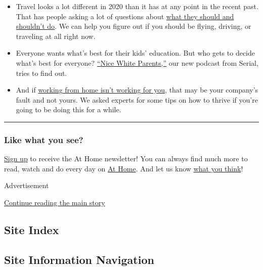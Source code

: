 \begin{itemize}
\item
  Travel looks a lot different in 2020 than it has at any point in the
  recent past. That has people asking a lot of questions about
  \href{https://www.nytimes.com/interactive/2020/07/31/travel/coronavirus-travel-risk.html}{what
  they should and shouldn't do}. We can help you figure out if you
  should be flying, driving, or traveling at all right now.
\item
  Everyone wants what's best for their kids' education. But who gets to
  decide what's best for everyone?
  \href{https://www.nytimes.com/2020/07/30/podcasts/nice-white-parents-serial.html?action=click\&module=Editors\%20Picks\&pgtype=Homepage}{``Nice
  White Parents,''} our new podcast from Serial, tries to find out.
\item
  And if
  \href{https://www.nytimes.com/2020/07/31/upshot/remote-work-tips.html}{working
  from home isn't working for you}, that may be your company's fault and
  not yours. We asked experts for some tips on how to thrive if you're
  going to be doing this for a while.
\end{itemize}

\begin{center}\rule{0.5\linewidth}{\linethickness}\end{center}

\hypertarget{like-what-you-see}{%
\subsubsection{Like what you see?}\label{like-what-you-see}}

\href{https://www.nytimes.com/newsletters/at-home}{Sign up} to receive
the At Home newsletter! You can always find much more to read, watch and
do every day on \href{https://www.nytimes.com/spotlight/at-home}{At
Home}. And let us know
\href{https://nyt.qualtrics.com/jfe/form/SV_e9cKGVFtci4CObz}{what you
think}!

Advertisement

\protect\hyperlink{after-bottom}{Continue reading the main story}

\hypertarget{site-index}{%
\subsection{Site Index}\label{site-index}}

\hypertarget{site-information-navigation}{%
\subsection{Site Information
Navigation}\label{site-information-navigation}}

